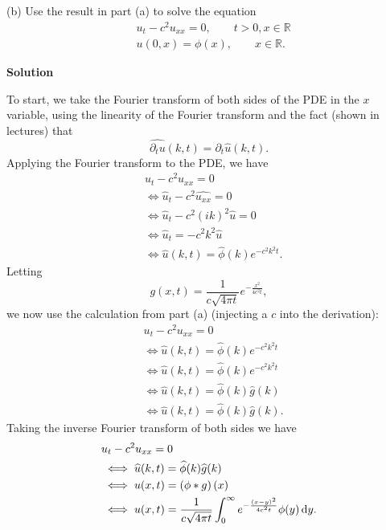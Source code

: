 \documentclass{article}
\begin{document}
\vspace{5mm}

(b) Use the result in part (a) to solve the equation
%
\begin{align*}
    &u_t - c^2 u_{x x} = 0, \quad \quad t > 0, x \in \mathbb{R} \\
    &u(0, x) = \phi(x), \quad \quad x \in \mathbb{R}
    .
\end{align*}

\textbf{Solution}

To start, we take the Fourier transform of both sides of the PDE in the
$x$ variable, using the linearity of the Fourier transform and the fact
(shown in lectures) that
%
\begin{equation*}
    \widehat{\partial_t u}(k, t) = \partial_t \widehat{u} (k, t)
    .
\end{equation*}
%
Applying the Fourier transform to the PDE, we have
%
\begin{align*}
    &u_t - c^2 u_{x x} = 0 \\
    &\iff \widehat{u}_t - c^2 \widehat{u_{x x}} = 0 \\
    &\iff \widehat{u}_t - c^2 (i k)^2 \widehat{u} = 0 \\
    &\iff \widehat{u}_t = - c^2 k^2 \widehat{u} \\
    &\iff \widehat{u}(k, t) = \widehat{\phi}(k) e^{- c^2 k^2 t}
    .
\end{align*}
%
Letting
%
\begin{equation*}
    g(x, t) = \frac{1}{c \sqrt{4 \pi t}} e^{- \frac{x^2}{4 c^2 t}}
    ,
\end{equation*}
%
we now use the calculation from part (a) (injecting a $c$ into the
derivation):
%
\begin{align*}
    &u_t - c^2 u_{x x} = 0 \\
    &\iff \widehat{u}(k, t) = \widehat{\phi}(k) e^{- c^2 k^2 t} \\
    &\iff \widehat{u}(k, t) = \widehat{\phi}(k) e^{- c^2 k^2 t} \\
    &\iff \widehat{u}(k, t) = \widehat{\phi}(k) \widehat{g}(k) \\
    &\iff \widehat{u}(k, t) = \widehat{\phi}(k) \widehat{g}(k)
    .
\end{align*}
%
Taking the inverse Fourier transform of both sides we have
%
\begin{align*}
    &u_t - c^2 u_{x x} = 0 \\
    &\iff \widehat{u}(k, t) = \widehat{\phi}(k) \widehat{g}(k) \\
    &\iff u(x, t) = \del{\phi * g}(x) \\
    &\iff u(x, t) = \frac{1}{c \sqrt{4 \pi t}} \int_0^\infty e^{- \frac{\del{x - y}^2}{4 c^2 t}} \phi(y) \dif y
    .
\end{align*}
\end{document}
